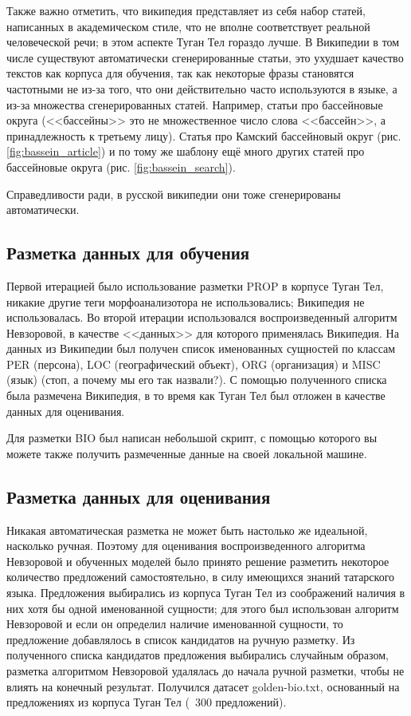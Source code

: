 Также важно отметить, что википедия представляет из себя набор статей, написанных в академическом стиле, что не вполне соответствует реальной человеческой речи; в этом аспекте Туган Тел гораздо лучше. В Википедии в том числе существуют автоматически сгенерированные статьи, это ухудшает качество текстов как корпуса для обучения, так как некоторые фразы становятся частотными не из-за того, что они действительно часто используются в языке, а из-за множества сгенерированных статей. Например, статьи про бассейновые округа (<<бассейны>> это не множественное число слова <<бассейн>>, а принадлежность к третьему лицу). Статья про Камский бассейновый округ (рис. \ref{fig:bassein_article}) и по тому же шаблону ещё много других статей про бассейновые округа (рис. \ref{fig:bassein_search}).

Справедливости ради, в русской википедии они тоже сгенерированы автоматически.

\subsection{Разметка данных для обучения}

Первой итерацией было использование разметки PROP в корпусе Туган Тел, никакие другие теги морфоанализотора не использовались; Википедия не использовалась. Во второй итерации использовался воспроизведенный алгоритм Невзоровой, в качестве <<данных>> для которого применялась Википедия. На данных из Википедии был получен список именованных сущностей по классам PER (персона), LOC (географический объект), ORG (организация) и MISC (язык) (стоп, а почему мы его так назвали?). С помощью полученного списка была размечена Википедия, в то время как Туган Тел был отложен в качестве данных для оценивания.

Для разметки BIO был написан небольшой скрипт, с помощью которого вы можете также получить размеченные данные на своей локальной машине.

\subsection{Разметка данных для оценивания}

Никакая автоматическая разметка не может быть настолько же идеальной, насколько ручная. Поэтому для оценивания воспроизведенного алгоритма Невзоровой и обученных моделей было принято решение разметить некоторое количество предложений самостоятельно, в силу имеющихся знаний татарского языка. Предложения выбирались из корпуса Туган Тел из соображений наличия в них хотя бы одной именованной сущности; для этого был использован алгоритм Невзоровой и если он определил наличие именованной сущности, то предложение добавлялось в список кандидатов на ручную разметку. Из полученного списка кандидатов предложения выбирались случайным образом, разметка алгоритмом Невзоровой удалялась до начала ручной разметки, чтобы не влиять на конечный результат. Получился датасет golden-bio.txt, основанный на предложениях из корпуса Туган Тел (~300 предложений).

